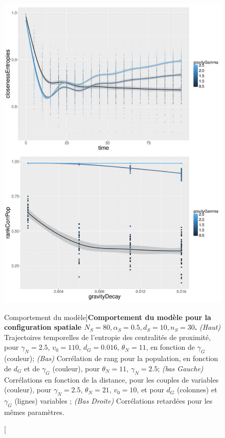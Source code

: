 \begin{figure}
	\includegraphics[width=\linewidth]{Figures/Final/6-1-3-fig-macrocoevolexplo-behavior.jpg}
	\caption[Model Behavior][Comportement du modèle]{}{\textbf{Comportement du modèle pour la configuration spatiale $N_S=80,\alpha_S=0.5,d_S=10,n_S=30$.} \textit{(Haut)} Trajectoires temporelles de l'entropie des centralités de proximité, pour $\gamma_N = 2.5$, $v_0 = 110$, $d_G = 0.016$, $\theta_N = 11$, en fonction de $\gamma_G$ (couleur); \textit{(Bas)} Corrélation de rang pour la population, en fonction de $d_G$ et de $\gamma_G$ (couleur), pour $\theta_N = 11$, $\gamma_N = 2.5$; \textit{(bas Gauche)} Corrélations en fonction de la distance, pour les couples de variables (couleur), pour $\gamma_N = 2.5$, $\theta_N = 21$, $v_0 = 10$, et pour $d_G$ (colonnes) et $\gamma_G$ (lignes) variables ; \textit{(Bas Droite)} Corrélations retardées pour les mêmes paramètres.\label{fig:macrocoevolexplo:behavior}}
\end{figure}



